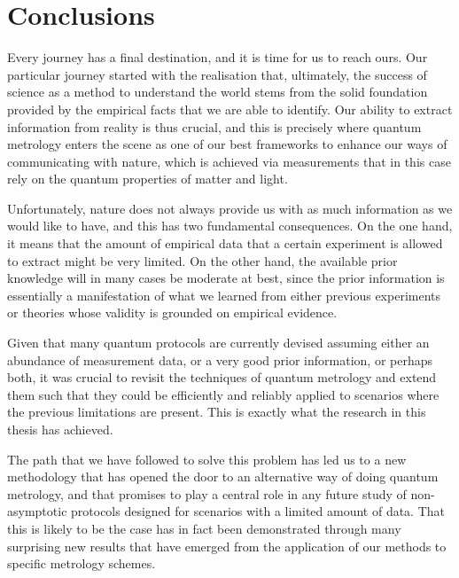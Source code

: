 \chapter{Conclusions}
\label{chap:conclusions}

Every journey has a final destination, and it is time for us to reach ours. Our particular journey started with the realisation that, ultimately, the success of science as a method to understand the world stems from the solid foundation provided by the empirical facts that we are able to identify. Our ability to extract information from reality is thus crucial, and this is precisely where quantum metrology enters the scene as one of our best frameworks to enhance our ways of communicating with nature, which is achieved via measurements that in this case rely on the quantum properties of matter and light. 

Unfortunately, nature does not always provide us with as much information as we would like to have, and this has two fundamental consequences. On the  one hand, it means that the amount of empirical data that a certain experiment is allowed to extract might be very limited. On the other hand, the available prior knowledge will in many cases be moderate at best, since the prior information is essentially a manifestation of what we learned from either previous experiments or theories whose validity is grounded on empirical evidence.

Given that many quantum protocols are currently devised assuming either an abundance of measurement data, or a very good prior information, or perhaps both, it was crucial to revisit the techniques of quantum metrology and extend them such that they could be efficiently and reliably applied to scenarios where the previous limitations are present. This is exactly what the research in this thesis has achieved.  

The path that we have followed to solve this problem has led us to a new methodology that has opened the door to an alternative way of doing quantum metrology, and that promises to play a central role in any future study of non-asymptotic protocols designed for scenarios with a limited amount of data. That this is likely to be the case has in fact been demonstrated through many surprising new results that have emerged from the application of our methods to specific metrology schemes. 

